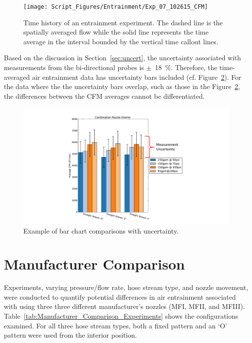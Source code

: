 \documentclass[12pt,oneside]{book}
\begin{document}
\begin{figure}[!ht]
\centering
\texttt{[image: Script\_Figures/Entrainment/Exp\_07\_102615\_CFM]} 
\caption[Time History of Entrainment Experiment]{Time history of an entrainment experiment. The dashed line is the spatially averaged flow while the solid line represents the time average in the interval bounded by the vertical time callout lines.}
\label{fig:cfmplotexplainer}
\end{figure}

Based on the discussion in Section~\ref{sec:uncert}, the uncertainty associated with measurements from the bi-directional probes is $\pm$~18~\%. Therefore, the time-averaged air entrainment data has uncertainty bars included (cf. Figure~\ref{fig:cfmbarexplainer}). For the data where the the uncertainty bars overlap, such as those in the Figure~\ref{fig:cfmbarexplainer}, the differences between the CFM averages cannot be differentiated. 

\begin{figure}[!ht]
\centering
\includegraphics[width=.8\columnwidth]{Figures/Air_Entrainment/Total_Entrainment_Example} 
\caption[Average Flow Rate Comparison]{Example of bar chart comparisons with uncertainty.}
\label{fig:cfmbarexplainer}
\end{figure}

\clearpage

\section{Manufacturer Comparison}

Experiments, varying pressure/flow rate, hose stream type, and nozzle movement, were conducted to quantify potential differences in air entrainment associated with using three three different manufacturer's nozzles (MFI, MFII, and MFIII). Table~\ref{tab:Manufacturer_Comparison_Experiments} shows the configurations examined. For all three hose stream types, both a fixed pattern and an `O' pattern were used from the interior position.
\end{document}
